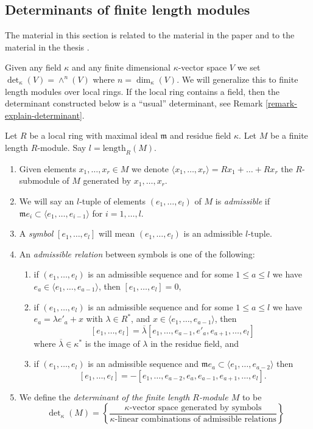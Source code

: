 \subsection{Determinants of finite length modules}
\label{subsection-determinants-finite-length}

\noindent
The material in this section is related to the material in
the paper \cite{determinant} and to the material in the
thesis \cite{Joe}.

\medskip\noindent
Given any field $\kappa$ and any finite dimensional $\kappa$-vector space
$V$ we set $\det_\kappa(V) = \wedge^n(V)$ where $n = \dim_\kappa(V)$.
We will generalize this to finite length modules over local rings.
If the local ring contains a field, then the determinant constructed
below is a ``usual'' determinant, see
Remark \ref{remark-explain-determinant}.

\begin{definition}
\label{definition-determinant}
Let $R$ be a local ring with maximal ideal $\mathfrak m$ and
residue field $\kappa$. Let $M$ be a finite length $R$-module.
Say $l = \text{length}_R(M)$.
\begin{enumerate}
\item Given elements $x_1, \ldots, x_r \in M$ we denote
$\langle x_1, \ldots, x_r \rangle = Rx_1 + \ldots + Rx_r$ the
$R$-submodule of $M$ generated by $x_1, \ldots, x_r$.
\item We will say an $l$-tuple of elements
$(e_1, \ldots, e_l)$ of $M$ is {\it admissible} if
$\mathfrak m e_i \subset \langle e_1, \ldots, e_{i - 1} \rangle$
for $i = 1, \ldots, l$.
\item A {\it symbol} $[e_1, \ldots, e_l]$ will mean
$(e_1, \ldots, e_l)$ is an admissible $l$-tuple.
\item An {\it admissible relation} between symbols is one of the following:
\begin{enumerate}
\item if $(e_1, \ldots, e_l)$ is an admissible sequence and
for some $1 \leq a \leq l$ we have
$e_a \in \langle e_1, \ldots, e_{a - 1}\rangle$, then
$[e_1, \ldots, e_l] = 0$,
\item if $(e_1, \ldots, e_l)$ is an admissible sequence and
for some $1 \leq a \leq l$ we have $e_a = \lambda e'_a + x$
with $\lambda \in R^*$, and
$x \in \langle e_1, \ldots, e_{a - 1}\rangle$, then
$$
[e_1, \ldots, e_l] =
\overline{\lambda} [e_1, \ldots, e_{a - 1}, e'_a, e_{a + 1}, \ldots, e_l]
$$
where $\overline{\lambda} \in \kappa^*$ is the image of $\lambda$ in
the residue field, and
\item if $(e_1, \ldots, e_l)$ is an admissible sequence and
$\mathfrak m e_a \subset \langle e_1, \ldots, e_{a - 2}\rangle$ then
$$
[e_1, \ldots, e_l] =
- [e_1, \ldots, e_{a - 2}, e_a, e_{a - 1}, e_{a + 1}, \ldots, e_l].
$$
\end{enumerate}
\item
We define the {\it determinant of the finite length $R$-module $M$} to be
$$
\det\nolimits_\kappa(M) =
\left\{
\frac{\kappa\text{-vector space generated by symbols}}
{\kappa\text{-linear combinations of admissible relations}}
\right\}
$$
\end{enumerate}
\end{definition}

